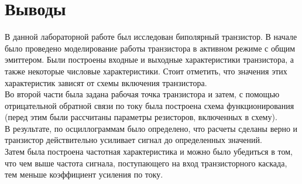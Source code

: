 \documentclass[12pt]{article}
\begin{document}
\section*{Выводы}
В данной лабораторной работе был исследован биполярный транзистор. В начале было проведено моделирование работы транзистора в активном режиме с общим эмиттером. Были построены входные и выходные характеристики транзистора, а также некоторые числовые характеристики. Стоит отметить, что значения этих характеристик зависят от схемы включения транзистора. \\
Во второй части была задана рабочая точка транзистора и затем, с помощью отрицательной обратной связи по току была построена схема функционирования (перед этим были рассчитаны параметры резисторов, включенных в схему). \\
В результате, по осциллограммам было определено, что расчеты сделаны верно и транзистор действительно усиливает сигнал до определенных значений. \\
Затем была построена частотная характеристика и можно было убедиться в том, что чем выше частота сигнала, поступающего на вход транзисторного каскада, тем меньше коэффициент усиления по току.
\end{document}
